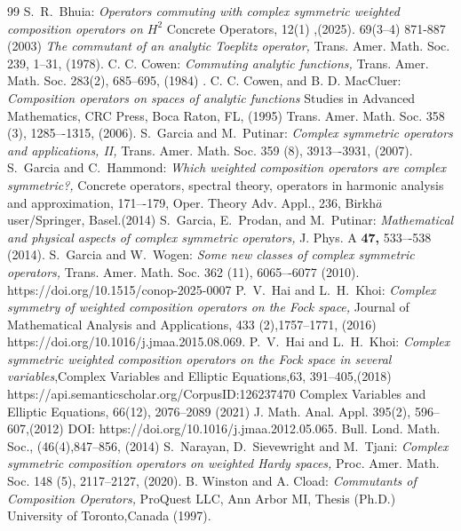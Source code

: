 \documentclass[reqno]{amsart}
\theoremstyle{remark}
\theoremstyle{Definition}
\theoremstyle{remark}
\numberwithin{equation}{section}
\begin{document}
\begin{thebibliography}{99}
 { S.~R.~Bhuia: }{\it Operators commuting with complex symmetric weighted composition operators on $H^{2}$ }{ Concrete Operators,} { 12(1) },(2025).
 {69(3--4)} {871-887} (2003)
 {\it The commutant of an analytic Toeplitz operator, } {Trans. Amer. Math. Soc.} {239}, {1--31}, (1978).
 {C. C. Cowen:} {\it Commuting analytic functions,} {Trans. Amer. Math. Soc.}  {283(2)}, {685--695}, (1984) .
 {C. C. Cowen, and B. D. MacCluer:} {\it Composition operators on spaces of analytic functions } { Studies in Advanced Mathematics,} { CRC Press}, {Boca Raton}, {FL}, (1995)
 {Trans. Amer. Math.
Soc. } { 358 (3)}, {1285–-1315}, (2006).
 { S.~Garcia and M.~Putinar: }{\it Complex symmetric operators and applications, II,} { Trans. Amer. Math. Soc. } {359 (8),} {3913–-3931}, (2007).
  { S.~Garcia and C.~Hammond: }{\it Which weighted composition operators are complex symmetric?,}
{ Concrete operators, spectral theory, operators in harmonic analysis and approximation, } {171–-179, }  {Oper.
Theory Adv. Appl., } {236}, { Birkh$\overset{..}a$user/Springer, Basel.}(2014)
 { S.~Garcia, E.~Prodan, and M.~Putinar: }{\it Mathematical and physical aspects of complex symmetric
operators,} {J. Phys. A} {\bf47, } {533–-538} (2014).
 {S.~Garcia and W.~Wogen: }{\it Some new classes of complex symmetric operators, } {Trans. Amer. Math.
Soc. } {362 (11)}, {6065–-6077}  (2010).
 https://doi.org/10.1515/conop-2025-0007
 { P.~V.~Hai and L.~H.~Khoi: }{\it Complex symmetry of weighted composition operators on the Fock space, } { Journal of Mathematical Analysis and Applications,}
{433 (2)},{1757--1771}, (2016)
{https://doi.org/10.1016/j.jmaa.2015.08.069}.
 { P.~V.~Hai and  L.~H.~Khoi: }{\it Complex symmetric weighted composition operators on the Fock space in several variables},{Complex Variables and Elliptic Equations},{63},
  {391--405},(2018){ https://api.semanticscholar.org/CorpusID:126237470}
  { Complex Variables and Elliptic Equations,} 66(12), {2076--2089} (2021)
 {J. Math. Anal. Appl.} {395(2)},
{596--607},(2012) {DOI: https://doi.org/10.1016/j.jmaa.2012.05.065}.
 { Bull. Lond. Math. Soc.,} (46(4),{847--856}, (2014)
 { S.~Narayan, D.~Sievewright and M.~Tjani: }{\it Complex symmetric composition operators on
weighted Hardy spaces,} { Proc. Amer. Math. Soc. } {148 (5)}, { 2117–2127}, (2020).
 {B. Winston and A. Cload: }{\it Commutants of Composition Operators, } { ProQuest LLC, Ann Arbor MI, }  {Thesis (Ph.D.)} {University of
Toronto,Canada} (1997).


\end{thebibliography}
\end{document}
